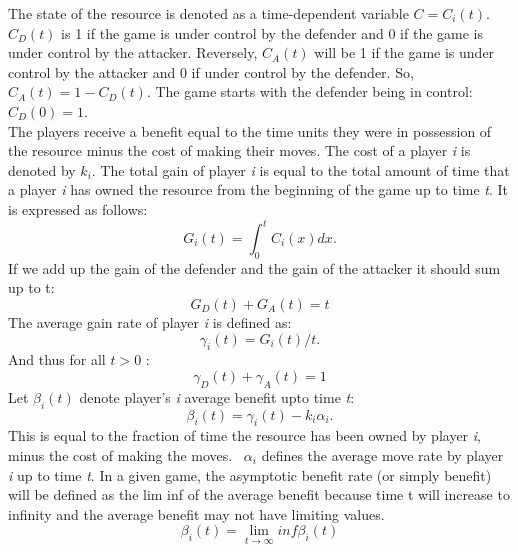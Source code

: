 \documentclass[journal,a4paper]{IEEEtran}
\begin{document}
The state of the resource is denoted as a time-dependent variable $C=C_{i}(t)$. 
$C_{D}(t)$ is 1 if the game is under control by the defender and 0 if the game is under control by the attacker. Reversely, $C_{A}(t)$ will be 1 if the game is under control by the attacker and 0 if under control by the defender. So, $C_{A}(t)= 1 - C_{D}(t)$.
The game starts with the defender being in control: $C_{D}(0)= 1$. \\


The players receive a benefit equal to the time units they were in possession of the resource minus the cost of making their moves. The cost of a player \textit{i} is denoted by $k_{i}$. 
The total gain of player \textit{i} is equal to the total amount of time that a player \textit{i} has owned the resource from the beginning of the game up to time \textit{t}. It is expressed as follows:
\begin{equation}\label{first}
G_{i}(t) = \int_0^t \! C_{i}(x) dx.
\end{equation}
If we add up the gain of the defender and the gain of the attacker it should sum up to t:
\begin{equation}\label{first}
G_{D}(t) + G_{A}(t) = t
\end{equation}
The average gain rate of player \textit{i} is defined as:
\begin{equation}\label{first}
\gamma_{i}(t) = G_{i}(t)/t.
\end{equation}
And thus for all $t > 0$ :
\begin{equation}\label{first}
\gamma_{D}(t) + \gamma_{A}(t) = 1
\end{equation}
Let $\beta_{i}(t)$ denote player's \textit{i} average benefit upto time \textit{t}:
\begin{equation}\label{first}
\beta_{i}(t) = \gamma_{i}(t) - k_{i}\alpha_{i}.
\end{equation}
This is equal to the fraction of time the resource has been owned by player \textit{i}, minus the cost of making the moves. ~$ \alpha_{i}$ defines the average move rate by player \textit{i} up to time \textit{t}.
In a given game, the asymptotic benefit rate (or simply benefit) will be defined as the lim inf of the average benefit because time t will increase to infinity and the average benefit may not have limiting values.
\begin{equation}
\beta_{i}(t)  = \lim_{t \to \infty} inf \beta_{i}(t) 
\end{equation}
\\
\end{document}
